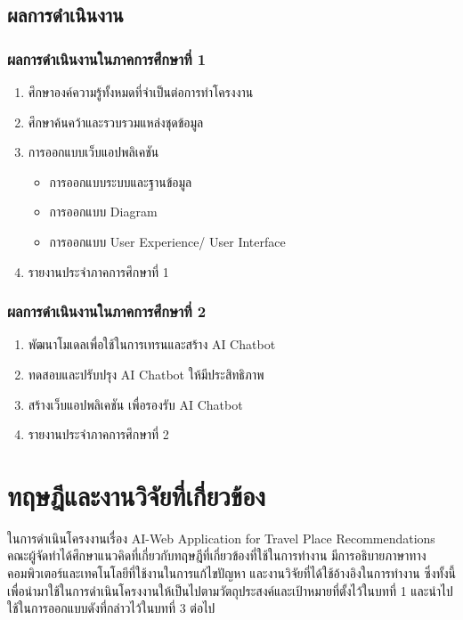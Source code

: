 \documentclass[12pt,oneside,openright,a4paper]{cpe-thai-project}
\begin{document}
\section{ผลการดำเนินงาน}
\subsection{ผลการดำเนินงานในภาคการศึกษาที่ 1}
\begin{enumerate}
\item ศึกษาองค์ความรู้ทั้งหมดที่จำเป็นต่อการทำโครงงาน
\item ศึกษาค้นคว้าและรวบรวมแหล่งชุดข้อมูล
\item การออกแบบเว็บแอปพลิเคชัน
	\begin{itemize}
	\item การออกแบบระบบและฐานข้อมูล
	\item การออกแบบ Diagram
	\item การออกแบบ User Experience/ User Interface
	\end{itemize}
\item รายงานประจำภาคการศึกษาที่ 1
\end{enumerate}

\subsection{ผลการดำเนินงานในภาคการศึกษาที่ 2}
\begin{enumerate}
\item พัฒนาโมเดลเพื่อใช้ในการเทรนและสร้าง AI Chatbot
\item ทดสอบและปรับปรุง AI Chatbot ให้มีประสิทธิภาพ
\item สร้างเว็บแอปพลิเคชัน เพื่อรองรับ AI Chatbot
\item รายงานประจำภาคการศึกษาที่ 2
\end{enumerate}

\chapter{ทฤษฎีและงานวิจัยที่เกี่ยวข้อง}
ในการดำเนินโครงงานเรื่อง AI-Web Application for Travel Place Recommendations คณะผู้จัดทำได้ศึกษาแนวคิดที่เกี่ยวกับทฤษฎีที่เกี่ยวข้องที่ใช้ในการทำงาน มีการอธิบายภาษาทางคอมพิวเตอร์และเทคโนโลยีที่ใช้งานในการแก้ไขปัญหา และงานวิจัยที่ได้ใช้อ้างอิงในการทำงาน ซึ่งทั้งนี้เพื่อนำมาใช้ในการดำเนินโครงงานให้เป็นไปตามวัตถุประสงค์และเป้าหมายที่ตั้งไว้ในบทที่ 1 และนําไปใช้ในการออกแบบดังที่กล่าวไว้ในบทที่ 3 ต่อไป

\end{document}
